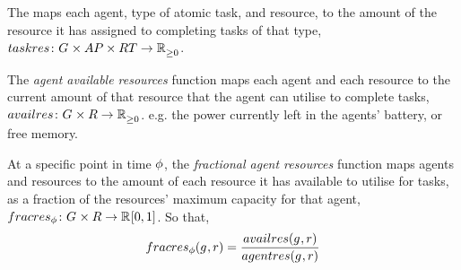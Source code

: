 The  maps each agent, type of atomic task, and resource, to the amount of the resource it has assigned to completing tasks of that type, $\formalTaskResourceAllocation{}{}$.

\newcommand{\functionAgentAvailableResourcesSymbol}[2]{
	\functionSymbol{availres}
}
\newcommand{\formalAgentAvailableResources}[2]{
	\functionFormal{\functionAgentAvailableResourcesSymbol{}{}}
	{\setAgents{}{} \times \setResource{}{}}
	{\setRealNumbersNonNegative{}{}}
}
\newcommand{\functionAgentAvailableResources}[2]{
	\functionSignature{\functionAgentAvailableResourcesSymbol{}{}}
	{\varAgent{}{}, \varResource{}{}}
}
The \textit{agent available resources} function maps each agent and each resource to the current amount of that resource that the agent can utilise to complete tasks, $\formalAgentAvailableResources{}{}$. e.g. the power currently left in the agents' battery, or free memory.

\newcommand{\functionFractionalAgentResourcesSymbol}[2]{
	\functionSymbol{fracres_{\varTime{}{}}}
}
\newcommand{\formalAgentResourcesAvailable}[2]{
	\functionFormal{\functionFractionalAgentResourcesSymbol{}{}}
	{\setAgents{}{} \times \setResource{}{}}
	{\setRealNumbersUnit{}{}}
}
\newcommand{\functionFractionalAgentResources}[2]{
	\functionSignature{\functionFractionalAgentResourcesSymbol{}{}}
	{\varAgent{}{}, \varResource{}{}}
}
\newcommand{\functionFractionalAgentEnergy}[2]{
	\functionSignature{\functionFractionalAgentResourcesSymbol{}{}}
	{\varAgent{}{}, \varResource{energy}{}}
}
At a specific point in time $\phi$, the \textit{fractional agent resources} function maps agents and resources to the amount of each resource it has available to utilise for tasks, as a fraction of the resources' maximum capacity for that agent, $\formalAgentResourcesAvailable{}{}$. So that,
\begin{equation}
	\functionFractionalAgentResources{}{}
	= \frac
	{\functionAgentAvailableResources{}{}}
	{\functionAgentResources{}{}}
\end{equation}


